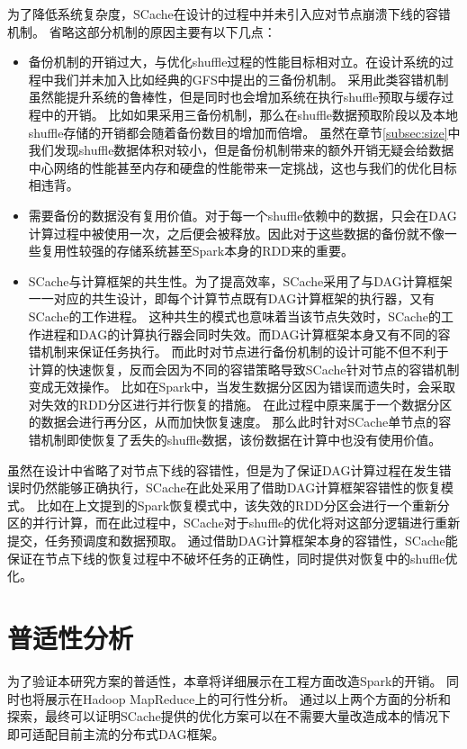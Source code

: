 为了降低系统复杂度，SCache在设计的过程中并未引入应对节点崩溃下线的容错机制。
省略这部分机制的原因主要有以下几点：
\begin{itemize}
    \item 备份机制的开销过大，与优化shuffle过程的性能目标相对立。在设计系统的过程中我们并未加入比如经典的GFS\cite{gfs}中提出的三备份机制。
    采用此类容错机制虽然能提升系统的鲁棒性，但是同时也会增加系统在执行shuffle预取与缓存过程中的开销。
    比如如果采用三备份机制，那么在shuffle数据预取阶段以及本地shuffle存储的开销都会随着备份数目的增加而倍增。
    虽然在章节\ref{subsec:size}中我们发现shuffle数据体积对较小，但是备份机制带来的额外开销无疑会给数据中心网络的性能甚至内存和硬盘的性能带来一定挑战，这也与我们的优化目标相违背。
    \item 需要备份的数据没有复用价值。对于每一个shuffle依赖中的数据，只会在DAG计算过程中被使用一次，之后便会被释放。因此对于这些数据的备份就不像一些复用性较强的存储系统甚至Spark本身的RDD来的重要。
    \item SCache与计算框架的共生性。为了提高效率，SCache采用了与DAG计算框架一一对应的共生设计，即每个计算节点既有DAG计算框架的执行器，又有SCache的工作进程。
    这种共生的模式也意味着当该节点失效时，SCache的工作进程和DAG的计算执行器会同时失效。而DAG计算框架本身又有不同的容错机制来保证任务执行。
    而此时对节点进行备份机制的设计可能不但不利于计算的快速恢复，反而会因为不同的容错策略导致SCache针对节点的容错机制变成无效操作。
    比如在Spark中，当发生数据分区因为错误而遗失时，会采取对失效的RDD分区进行并行恢复的措施。
    在此过程中原来属于一个数据分区的数据会进行再分区，从而加快恢复速度。
    那么此时针对SCache单节点的容错机制即使恢复了丢失的shuffle数据，该份数据在计算中也没有使用价值。
\end{itemize}

虽然在设计中省略了对节点下线的容错性，但是为了保证DAG计算过程在发生错误时仍然能够正确执行，SCache在此处采用了借助DAG计算框架容错性的恢复模式。
比如在上文提到的Spark恢复模式中，该失效的RDD分区会进行一个重新分区的并行计算，而在此过程中，SCache对于shuffle的优化将对这部分逻辑进行重新提交，任务预调度和数据预取。
通过借助DAG计算框架本身的容错性，SCache能保证在节点下线的恢复过程中不破坏任务的正确性，同时提供对恢复中的shuffle优化。

\section{普适性分析}
\label{sec:impl}

为了验证本研究方案的普适性，本章将详细展示在工程方面改造Spark的开销。
同时也将展示在Hadoop MapReduce上的可行性分析。
通过以上两个方面的分析和探索，最终可以证明SCache提供的优化方案可以在不需要大量改造成本的情况下即可适配目前主流的分布式DAG框架。

